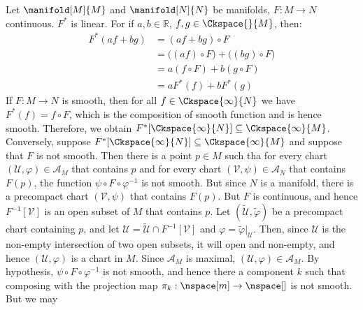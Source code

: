 \documentclass{article}                                                        %
\begin{document}
        \begin{solution}
            Let $\manifold[M]{M}$ and $\manifold[N]{N}$ be manifolds,
            $F:M\rightarrow{N}$ continuous. $F^{*}$ is linear. For if
            $a,b\in\mathbb{R}$, $f,g\in\Ckspace{}{M}$, then:
            \begin{subequations}
                \begin{align}
                    F^{*}(af+bg)&=(af+bg)\circ{F}\\
                    &=\big((af)\circ{F}\big)+\big((bg)\circ{F}\big)\\
                    &=a(f\circ{F})+b(g\circ{F})\\
                    &=aF^{*}(f)+bF^{*}(g)
                \end{align}
            \end{subequations}
            If $F:M\rightarrow{N}$ is smooth, then for all
            $f\in\Ckspace{\infty}{N}$ we have $F^{*}(f)=f\circ{F}$, which is the
            composition of smooth function and is hence smooth. Therefore, we
            obtain $F^{*}[\Ckspace{\infty}{N}]\subseteq\Ckspace{\infty}{M}$.
            Conversely, suppose
            $F^{*}[\Ckspace{\infty}{N}]\subseteq\Ckspace{\infty}{M}$ and suppose
            that $F$ is not smooth. Then there is a point $p\in{M}$ such tha for
            every chart $(\mathcal{U},\varphi)\in\mathcal{A}_{M}$ that contains
            $p$ and for every chart $(\mathcal{V},\psi)\in\mathcal{A}_{N}$ that
            contains $F(p)$, the function $\psi\circ{F}\circ\varphi^{\minus{1}}$
            is not smooth. But since $N$ is a manifold, there is a precompact
            chart $(\mathcal{V},\psi)$ that contains $F(p)$. But $F$ is
            continuous, and hence $F^{\minus{1}}[\mathcal{V}]$ is an open subset
            of $M$ that contains $p$. Let
            $(\tilde{\mathcal{U}},\tilde{\varphi})$ be a precompact chart
            containing $p$, and let
            $\mathcal{U}=\tilde{\mathcal{U}}\cap{F}^{\minus{1}}[\mathcal{V}]$
            and $\varphi=\tilde{\varphi}|_{\mathcal{U}}$. Then, since
            $\mathcal{U}$ is the non-empty intersection of two open subsets,
            it will open and non-empty, and hence $(\mathcal{U},\varphi)$
            is a chart in $M$. Since $\mathcal{A}_{M}$ is maximal,
            $(\mathcal{U},\varphi)\in\mathcal{A}_{M}$. By hypothesis,
            $\psi\circ{F}\circ\varphi^{\minus{1}}$ is not smooth, and hence
            there a component $k$ such that composing with the projection map
            $\pi_{k}:\nspace[m]\rightarrow\nspace[]$ is not smooth. But we may

\end{solution}
\end{document}
